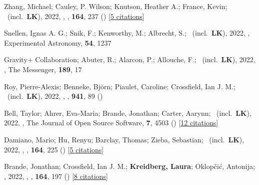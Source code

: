 \item[{\color{numcolor}\scriptsize77}] Zhang, Michael; Cauley, P. Wilson; Knutson, Heather A.; France, Kevin; \etal\ (incl.\ \textbf{LK}), 2022, , \aj, \textbf{164}, 237 () [\href{https://ui.adsabs.harvard.edu/abs/2022AJ....164..237Z}{5 citations}]

\item[{\color{numcolor}\scriptsize76}] Snellen, Ignas A. G.; Snik, F.; Kenworthy, M.; Albrecht, S.; \etal\ (incl.\ \textbf{LK}), 2022, , Experimental Astronomy, \textbf{54}, 1237

\item[{\color{numcolor}\scriptsize75}] Gravity+ Collaboration; Abuter, R.; Alarcon, P.; Allouche, F.; \etal\ (incl.\ \textbf{LK}), 2022, , The Messenger, \textbf{189}, 17

\item[{\color{numcolor}\scriptsize74}] Roy, Pierre-Alexis; Benneke, Bj{\"o}rn; Piaulet, Caroline; Crossfield, Ian J. M.; \etal\ (incl.\ \textbf{LK}), 2022, , \apj, \textbf{941}, 89 ()

\item[{\color{numcolor}\scriptsize73}] Bell, Taylor; Ahrer, Eva-Maria; Brande, Jonathan; Carter, Aarynn; \etal\ (incl.\ \textbf{LK}), 2022, , The Journal of Open Source Software, \textbf{7}, 4503 () [\href{https://ui.adsabs.harvard.edu/abs/2022JOSS....7.4503B}{12 citations}]

\item[{\color{numcolor}\scriptsize72}] Damiano, Mario; Hu, Renyu; Barclay, Thomas; Zieba, Sebastian; \etal\ (incl.\ \textbf{LK}), 2022, , \aj, \textbf{164}, 225 () [\href{https://ui.adsabs.harvard.edu/abs/2022AJ....164..225D}{5 citations}]

\item[{\color{numcolor}\scriptsize71}] Brande, Jonathan; Crossfield, Ian J. M.; \textbf{Kreidberg, Laura}; Oklop{\v{c}}i{\'c}, Antonija; \etal, 2022, , \aj, \textbf{164}, 197 () [\href{https://ui.adsabs.harvard.edu/abs/2022AJ....164..197B}{8 citations}]

